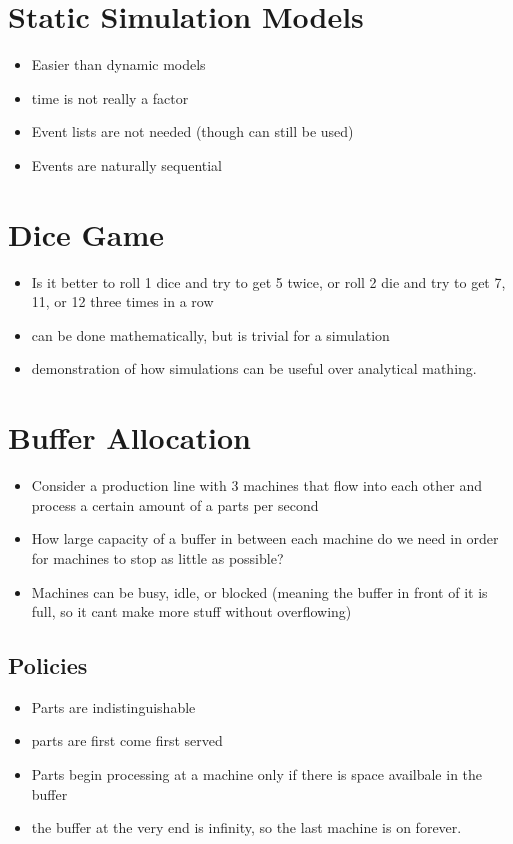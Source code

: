\documentclass[fleqn]{report}
\begin{document}
\section{Static Simulation Models}
\begin{itemize}
    \item 
Easier than dynamic models 
\item 
time is not really a factor 
\item 
Event lists are not needed (though can still be used)
\item 
Events are naturally sequential 
\end{itemize}

\section{Dice Game}
\begin{itemize}
    \item 
Is it better to roll 1 dice and try to get 5 twice, or roll 2 die and try 
to get 7, 11, or 12 three times in a row 
    \item 
can be done mathematically, but is trivial for a simulation 
    \item 
demonstration of how simulations can be useful over analytical mathing. 
\end{itemize}

\section{Buffer Allocation}
\begin{itemize}
    \item 
Consider a production line with 3 machines that flow into each other 
and process a certain amount of a parts per second
\item 
How large capacity of a buffer in between each machine do we need in order for machines 
to stop as little as possible?
\item 
Machines can be busy, idle, or blocked (meaning the buffer in front of it is 
full, so it cant make more stuff without overflowing)
\end{itemize}

\subsection{Policies}
\begin{itemize}
    \item 
    Parts are indistinguishable 
    \item 
    parts are first come first served 
    \item 
    Parts begin processing at a machine only if 
    there is space availbale in the buffer 
    \item 
    the buffer at the very end is infinity, so the last machine is on forever. 
\end{itemize}
\end{document}
